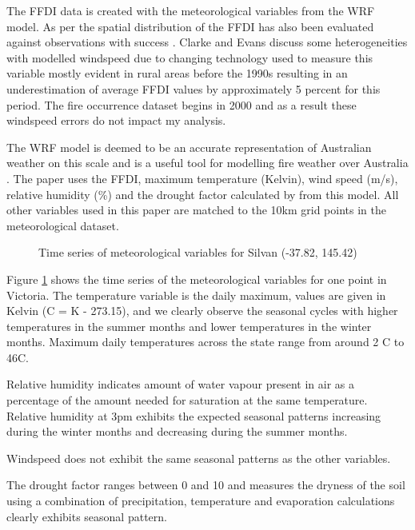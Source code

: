 \documentclass[11pt,a4paper]{article}
\begin{document}
The FFDI data is created with the meteorological variables from the WRF model. As per \citet{clarkeevans13} the spatial distribution of the FFDI has also been evaluated against observations with success  \citep{sanabria13}. Clarke and Evans discuss some heterogeneities with modelled windspeed due to changing technology used to measure this variable mostly evident in rural areas before the 1990s resulting in an underestimation of average FFDI values by approximately 5 percent for this period. The fire occurrence dataset begins in 2000 and as a result these windspeed errors do not impact my analysis.

The WRF model \citep{evans10} is deemed to be an accurate representation of Australian weather on this scale and is a useful tool for modelling fire weather over Australia \citep{clarke2013}. The paper uses the FFDI, maximum temperature (Kelvin), wind speed (m/s), relative humidity (\%) and the drought factor calculated by \citet{clarke2013}  from this model. All other variables used in this paper are matched to the 10km grid points in the meteorological dataset. 

\begin{figure}[!ht]
	\centering 
	\caption{Time series of meteorological variables for Silvan (-37.82, 145.42)} 
	\label{fig:silv} 
\end{figure}

Figure \ref{fig:silv} shows the time series of the meteorological variables for one point in Victoria. The temperature variable is the daily maximum, values are given in Kelvin (\degree C = K - 273.15), and we clearly observe the seasonal cycles with higher temperatures in the summer months and lower temperatures in the winter months. Maximum daily temperatures across the state range from around 2 \degree C to 46\degree  C. 

Relative humidity indicates amount of water vapour present in air as a percentage of the amount needed for saturation at the same temperature. Relative humidity at 3pm exhibits the expected seasonal patterns increasing during the winter months and decreasing during the summer months. 

Windspeed does not exhibit the same seasonal patterns as the other variables. 

The drought factor ranges between 0 and 10 and measures the dryness of the soil using a combination of precipitation, temperature and evaporation calculations \citep{keetch68} clearly exhibits seasonal pattern.
\end{document}
